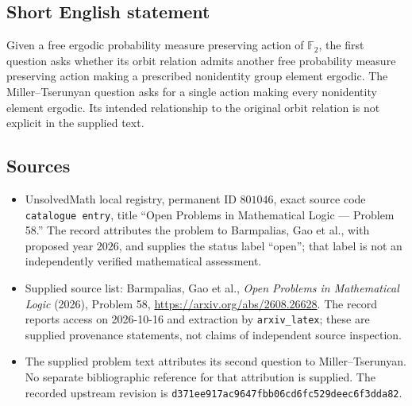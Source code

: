 \documentclass[11pt]{article}
\begin{document}
\subsection{Short English statement}
Given a free ergodic probability measure preserving action of \(\mathbb F_2\), the first question asks whether its orbit relation admits another free probability measure preserving action making a prescribed nonidentity group element ergodic. The Miller--Tserunyan question asks for a single action making every nonidentity element ergodic. Its intended relationship to the original orbit relation is not explicit in the supplied text.
\subsection{Sources}
\begin{itemize}
\item UnsolvedMath local registry, permanent ID \(801046\), exact source code \texttt{catalogue entry}, title ``Open Problems in Mathematical Logic --- Problem 58.'' The record attributes the problem to Barmpalias, Gao et al., with proposed year \(2026\), and supplies the status label ``open''; that label is not an independently verified mathematical assessment.
\item Supplied source list: Barmpalias, Gao et al., \emph{Open Problems in Mathematical Logic} (2026), Problem 58, \url{https://arxiv.org/abs/2608.26628}. The record reports access on 2026-10-16 and extraction by \texttt{arxiv\_latex}; these are supplied provenance statements, not claims of independent source inspection.
\item The supplied problem text attributes its second question to Miller--Tserunyan. No separate bibliographic reference for that attribution is supplied. The recorded upstream revision is \texttt{d371ee917ac9647fbb06cd6fc529deec6f3dda82}.
\end{itemize}
\end{document}
